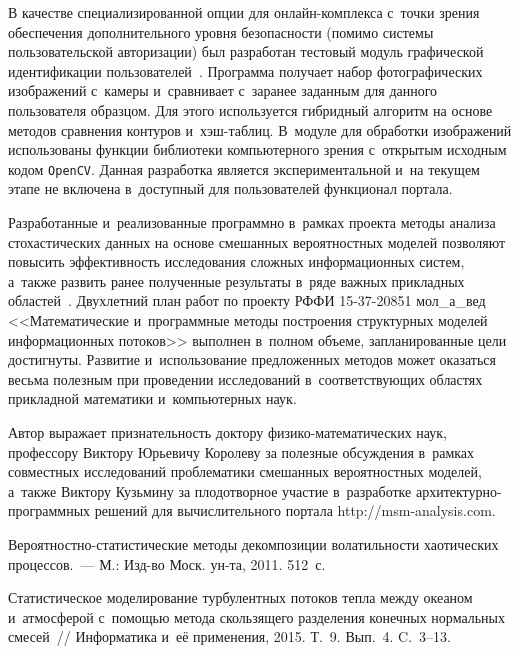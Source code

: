 \begin{multicols}{2}
В качестве специализированной опции для он\-лайн-комп\-лек\-са с~точки зрения 
обеспечения дополнительного уровня безопасности (помимо сис\-те\-мы пользовательской 
авторизации) был разработан тестовый модуль графической идентификации 
пользователей~\cite{Gorshenin2016Soft5}. Программа получает набор фотографических 
изображений с~камеры и~сравнивает с~заранее заданным для данного пользователя 
образцом. Для этого используется гибридный алгоритм на основе методов сравнения 
контуров и~хэш-таб\-лиц. В~модуле для обработки изображений использованы функции 
библиотеки компьютерного зрения с~открытым исходным кодом \verb"OpenCV". 
Данная разработка является экспериментальной и~на текущем этапе не включена 
в~доступный для пользователей функционал портала.

Разработанные и~реализованные программно в~рамках проекта методы анализа 
стохастических данных на основе смешанных вероятностных моделей позволяют 
повысить эффективность исследования сложных информационных сис\-тем, а~так\-же
развить ранее полученные результаты в~ряде важных прикладных областей~\cite{29-a}. 
Двухлетний план работ по проекту 
РФФИ 15-37-20851 мол\_а\_вед <<Математические и~программные методы построения 
структурных моделей информационных потоков>> выполнен в~полном объеме, 
запланированные цели достигнуты. Развитие и~использование предложенных 
методов может оказаться весьма полезным при проведении исследований в~соответствующих 
областях прикладной математики и~компьютерных наук.

\bigskip

Автор выражает признательность доктору фи\-зи\-ко-ма\-те\-ма\-ти\-че\-ских наук, профессору Виктору Юрьевичу
 Королеву за полезные обсуждения в~рамках совместных исследований проблематики 
 смешанных вероятностных моделей, а~также Виктору Кузьмину за плодотворное участие 
 в~разработке ар\-хи\-тек\-тур\-но-про\-грам\-мных решений для вычислительного портала 
 {\sf http://msm-analysis.com}.

{\small\frenchspacing
 {%
 \begin{thebibliography}{99}
 Ве\-ро\-ят\-ност\-но-ста\-ти\-сти\-че\-ские 
методы декомпозиции волатильности хаотических процессов.~--- М.: Изд-во Моск. ун-та, 
2011. 512~с.

 Статистическое 
моделирование турбулентных потоков тепла между океаном и~атмосферой 
с~по\-мощью метода скользящего разделения конечных нормальных смесей~// Информатика 
и~её применения, 2015. Т.~9. Вып.~4. C.~3--13.


\end{thebibliography}}}
\end{multicols}
